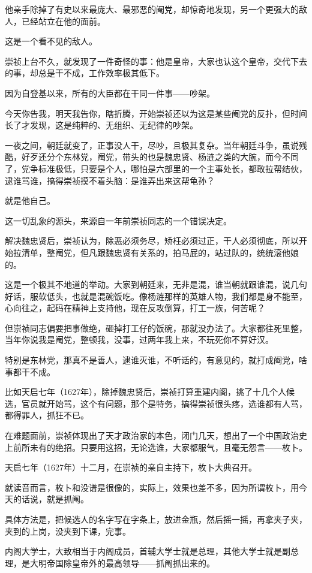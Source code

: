 \begin{multicols}{\theparacolNo}
他亲手除掉了有史以来最庞大、最邪恶的阉党，却惊奇地发现，另一个更强大的敌人，已经站立在他的面前。

这是一个看不见的敌人。

崇祯上台不久，就发现了一件奇怪的事：他是皇帝，大家也认这个皇帝，交代下去的事，却总是干不成，工作效率极其低下。

因为自登基以来，所有的大臣都在干同一件事——吵架。

今天你告我，明天我告你，瞎折腾，开始崇祯还以为这是某些阉党的反扑，但时间长了才发现，这是纯粹的、无组织、无纪律的吵架。

一夜之间，朝廷就变了，正事没人干，尽吵，且极其复杂。当年朝廷斗争，虽说残酷，好歹还分个东林党，阉党，带头的也是魏忠贤、杨涟之类的大腕，而今不同了，党争标准极低，只要是个人，哪怕是六部里的一个主事处长，都敢拉帮结伙，逮谁骂谁，搞得崇祯摸不着头脑：是谁弄出来这帮龟孙？

就是他自己。

这一切乱象的源头，来源自一年前崇祯同志的一个错误决定。

解决魏忠贤后，崇祯认为，除恶必须务尽，矫枉必须过正，干人必须彻底，所以开始拉清单，整阉党，但凡跟魏忠贤有关系的，拍马屁的，站过队的，统统滚他娘的。

这是一个极其不地道的举动。大家到朝廷来，无非是混，谁当朝就跟谁混，说几句好话，服软低头，也就是混碗饭吃。像杨涟那样的英雄人物，我们都是身不能至，心向往之，起码在精神上支持他，现在反攻倒算，打工一族，何苦呢？

但崇祯同志偏要把事做绝，砸掉打工仔的饭碗，那就没办法了。大家都往死里整，当年你说我是阉党，整顿我，没事，过两年我上来，不玩死你不算好汉。

特别是东林党，那真不是善人，逮谁灭谁，不听话的，有意见的，就打成阉党，啥事都干不成。

比如天启七年（1627年），除掉魏忠贤后，崇祯打算重建内阁，挑了十几个人候选，官员就开始骂，这个有问题，那个是特务，搞得崇祯很头疼，选谁都有人骂，都得罪人，抓狂不已。

在难题面前，崇祯体现出了天才政治家的本色，闭门几天，想出了一个中国政治史上前所未有的绝招。只要用这招，无论选谁，大家都服气，且毫无怨言——枚卜。

天启七年（1627年）十二月，在崇祯的亲自主持下，枚卜大典召开。

就读音而言，枚卜和没谱是很像的，实际上，效果也差不多，因为所谓枚卜，用今天的话说，就是抓阄。

具体方法是，把候选人的名字写在字条上，放进金瓶，然后摇一摇，再拿夹子夹，夹到的上岗，没夹到下课，完事。

内阁大学士，大致相当于内阁成员，首辅大学士就是总理，其他大学士就是副总理，是大明帝国除皇帝外的最高领导——抓阄抓出来的。


\end{multicols}
